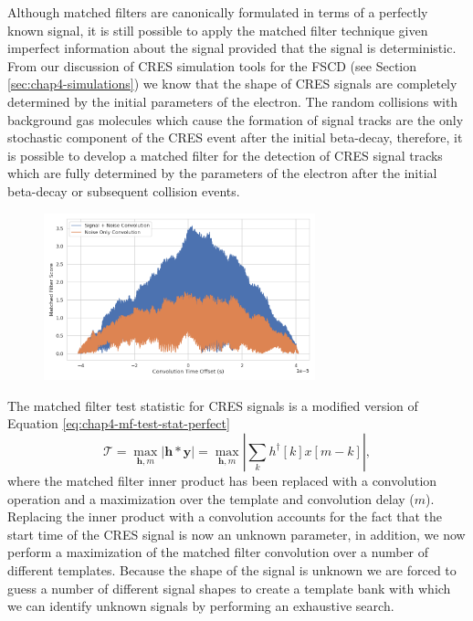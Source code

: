 Although matched filters are canonically formulated in terms of a perfectly known signal, it is still possible to apply the matched filter technique given imperfect information about the signal provided that the signal is deterministic. From our discussion of CRES simulation tools for the FSCD (see Section \ref{sec:chap4-simulations}) we know that the shape of CRES signals are completely determined by the initial parameters of the electron. The random collisions with background gas molecules which cause the formation of signal tracks are the only stochastic component of the CRES event after the initial beta-decay, therefore, it is possible to develop a matched filter for the detection of CRES signal tracks which are fully determined by the parameters of the electron after the initial beta-decay or subsequent collision events.

\begin{figure}[htbp]
    \centering
    \includegraphics*[width=0.7\textwidth]{figs/Chapter-4/220318_example_convolution.png}
    \caption{}
\end{figure}

The matched filter test statistic for CRES signals is a modified version of Equation \ref{eq:chap4-mf-test-stat-perfect}
\begin{equation}
    \mathcal{T} = \max_{\bm{h},m}\left|\bm{h}\ast\bm{y}\right|=\max_{\bm{h},m}\left|\sum_{k}h^\dagger[k]x[m-k]\right|,
    \label{eq:chap4-mf-test-stat-conv}
\end{equation}
where the matched filter inner product has been replaced with a convolution operation and a maximization over the template and convolution delay ($m$). Replacing the inner product with a convolution accounts for the fact that the start time of the CRES signal is now an unknown parameter, in addition, we now perform a maximization of the matched filter convolution over a number of different templates. Because the shape of the signal is unknown we are forced to guess a number of different signal shapes to create a template bank with which we can identify unknown signals by performing an exhaustive search.

